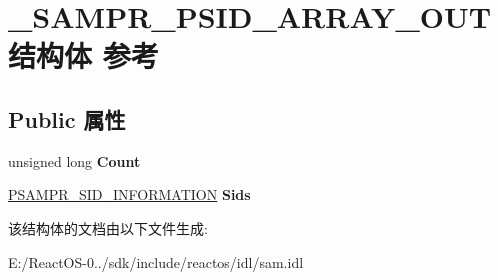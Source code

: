 \hypertarget{struct___s_a_m_p_r___p_s_i_d___a_r_r_a_y___o_u_t}{}\section{\+\_\+\+S\+A\+M\+P\+R\+\_\+\+P\+S\+I\+D\+\_\+\+A\+R\+R\+A\+Y\+\_\+\+O\+U\+T结构体 参考}
\label{struct___s_a_m_p_r___p_s_i_d___a_r_r_a_y___o_u_t}
\subsection*{Public 属性}
\begin{DoxyCompactItemize}
\item 
\mbox{\label{struct___s_a_m_p_r___p_s_i_d___a_r_r_a_y___o_u_t_afef23b93c0d4c03c9cf5a2faeafcf4c8}} 
unsigned long {\bfseries Count}
\item 
\mbox{\label{struct___s_a_m_p_r___p_s_i_d___a_r_r_a_y___o_u_t_aeb75164e5f0c9d9baf0b800df465c671}} 
\hyperlink{struct___s_a_m_p_r___s_i_d___i_n_f_o_r_m_a_t_i_o_n}{P\+S\+A\+M\+P\+R\+\_\+\+S\+I\+D\+\_\+\+I\+N\+F\+O\+R\+M\+A\+T\+I\+ON} {\bfseries Sids}
\end{DoxyCompactItemize}


该结构体的文档由以下文件生成\+:\begin{DoxyCompactItemize}
\item 
E\+:/\+React\+O\+S-\/0../sdk/include/reactos/idl/sam.\+idl\end{DoxyCompactItemize}
